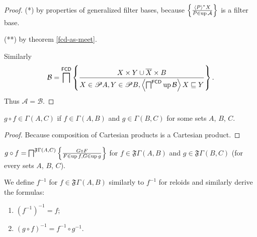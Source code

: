 \begin{proof}
({*}) by properties of generalized filter bases, because $\left\{ \frac{\left\langle P\right\rangle ^{\ast}X}{P\in\operatorname{up}\mathcal{A}}\right\}$
is a filter base.

({*}{*}) by theorem \ref{fcd-as-meet}.

Similarly 
\[
\mathcal{B}=\bigsqcap^{\mathsf{FCD}}\left\{ \frac{X\times Y\cup\overline{X}\times B}{X\in\mathscr{P} A,Y\in\mathscr{P} B,\left\langle \bigsqcap^{\mathsf{FCD}}\operatorname{up}\mathcal{B}\right\rangle X\sqsubseteq Y}\right\}.
\]
Thus $\mathcal{A}=\mathcal{B}$.\end{proof}
\begin{prop}
$g\circ f\in\Gamma(A,C)$ if $f\in\Gamma(A,B)$ and $g\in\Gamma(B,C)$
for some sets $A$, $B$, $C$.\end{prop}
\begin{proof}
Because composition of Cartesian products is a Cartesian product.\end{proof}
\begin{defn}
$g\circ f=\bigsqcap^{\mathfrak{F}\Gamma(A,C)}\left\{ \frac{G\circ F}{F\in\operatorname{up} f,G\in\operatorname{up} g}\right\}$
for $f\in\mathfrak{F}\Gamma(A,B)$ and $g\in\mathfrak{F}\Gamma(B,C)$
(for every sets $A$, $B$, $C$).
\end{defn}
We define $f^{-1}$ for $f\in\mathfrak{F}\Gamma(A,B)$ similarly to
$f^{-1}$ for reloids and similarly derive the formulas:
\begin{enumerate}
\item $(f^{-1})^{-1}=f$;
\item $(g\circ f)^{-1}=f^{-1}\circ g^{-1}$.
\end{enumerate}

